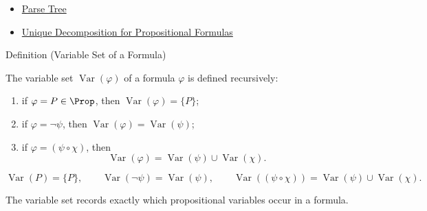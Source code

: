 \begin{dependencies}
\begin{itemize}
  \item \hyperref[def:parse-tree-propositional-logic]{Parse Tree}
  \item \hyperref[thm:unique-decomposition-propositional-formulas]{Unique Decomposition for Propositional Formulas}
\end{itemize}
\end{dependencies}
\begin{definitionbox}{Definition (Variable Set of a Formula)}
\begin{definition}
\label{def:formula-variable-set-propositional-logic}
The variable set \(\operatorname{Var}(\varphi)\) of a formula \(\varphi\) is defined recursively:
\begin{enumerate}
\item if \(\varphi=P\in\Prop\), then \(\operatorname{Var}(\varphi)=\{P\}\);
\item if \(\varphi=\neg\psi\), then \(\operatorname{Var}(\varphi)=\operatorname{Var}(\psi)\);
\item if \(\varphi=(\psi\circ\chi)\), then
\[
\operatorname{Var}(\varphi)=\operatorname{Var}(\psi)\cup\operatorname{Var}(\chi).
\]
\end{enumerate}
\end{definition}
\end{definitionbox}

\begin{remark*}
\[
\operatorname{Var}(P)=\{P\},\qquad
\operatorname{Var}(\neg\psi)=\operatorname{Var}(\psi),\qquad
\operatorname{Var}((\psi\circ\chi))=\operatorname{Var}(\psi)\cup\operatorname{Var}(\chi).
\]
\end{remark*}

\begin{remark*}[Interpretation]
The variable set records exactly which propositional variables occur in a formula.
\end{remark*}

